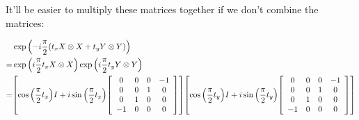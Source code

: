 \documentclass{article}
\begin{document}
It'll be easier to multiply these matrices together if we don't combine the matrices:

\begin{align*}
  &\exp\pqty{-i\frac{\pi}{2}\pqty{t_x X\otimes X + t_y Y\otimes Y}} \\
  =& \exp\pqty{i\frac{\pi}{2}t_x X\otimes X} \exp\pqty{i\frac{\pi}{2}t_y Y\otimes Y} \\
  =&
  \bqty{
  \cos\pqty{\frac{\pi}{2}t_x} I
  +
  i\sin\pqty{\frac{\pi}{2}t_x}
  \bqty{
  \begin{array}{cccc}
    0&0&0&-1 \\
    0&0&1&0 \\
    0&1&0&0 \\
    -1&0&0&0 \\
  \end{array}
  }
  }
  \bqty{
  \cos\pqty{\frac{\pi}{2}t_y} I
  +
  i\sin\pqty{\frac{\pi}{2}t_y}
  \bqty{
  \begin{array}{cccc}
    0&0&0&-1 \\
    0&0&1&0 \\
    0&1&0&0 \\
    -1&0&0&0 \\
  \end{array}
  }
  }
\end{align*}
\end{document}
